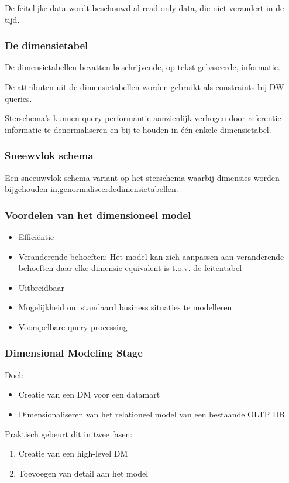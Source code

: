 \documentclass[a4paper,12pt]{article}
\begin{document}
De feitelijke data wordt beschouwd al read-only data, die niet verandert in de tijd.

\subsubsection{De dimensietabel}
De dimensietabellen bevatten beschrijvende, op tekst gebaseerde, informatie.

De attributen uit de dimensietabellen worden gebruikt als constraints bij DW queries.

Sterschema's kunnen query performantie aanzienlijk verhogen door referentie-informatie te denormaliseren en bij te houden in één enkele dimensietabel.

\subsubsection{Sneewvlok schema}
Een sneeuwvlok schema variant op het sterschema waarbij dimensies worden bijgehouden in,genormaliseerdedimensietabellen.

\subsubsection{Voordelen van het dimensioneel model}
\begin{itemize}
\item Efficiëntie
\item Veranderende behoeften: Het model kan zich aanpassen aan veranderende behoeften daar elke dimensie equivalent is t.o.v. de feitentabel
\item Uitbreidbaar
\item Mogelijkheid om standaard business situaties te modelleren
\item Voorspelbare query processing
\end{itemize}

\subsubsection{Dimensional Modeling Stage}
Doel:
\begin{itemize}
\item Creatie van een DM voor een datamart
\item Dimensionaliseren van het relationeel model van een bestaande OLTP DB
\end{itemize}

Praktisch gebeurt dit in twee fasen:
\begin{enumerate}
\item Creatie van een high-level DM
\item Toevoegen van detail aan het model
\end{enumerate}
\end{document}
